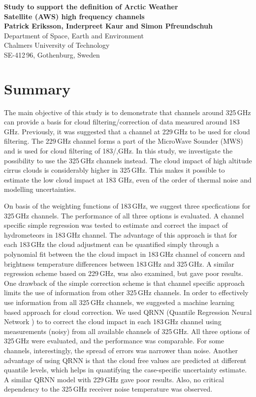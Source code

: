\documentclass[12pt]{article}
\begin{document}
\thispagestyle{empty}
\noindent
\textbf{\Large Study to support the definition of Arctic Weather \vspace{1mm}\\
Satellite (AWS) high frequency channels} \vspace{8mm}\\
{\bf Patrick Eriksson, Inderpreet Kaur and Simon Pfreundschuh}\\
Department of Space, Earth and Environment\\
Chalmers University of Technology\\
SE-412\,96, Gothenburg, Sweden\vspace{10mm}

\section*{Summary}
%
The main objective of this study is to demonstrate that channels around 325\,GHz can provide a basis for cloud filtering/correction of data measured around 183\,GHz. Previously, it was suggested that a channel at 229\,GHz to be used for cloud filtering. The 229\,GHz channel forms a part of the MicroWave Sounder (MWS) and  is used for cloud filtering of 183/,GHz. In this study, we investigate the possibility to use the 325\,GHz channels instead. The cloud impact of high altitude cirrus clouds is considerably higher in 325\,GHz. This makes it possible to estimate the low cloud impact at 183 GHz, even of the order of thermal noise and modelling uncertainties.

On basis of the weighting functions of 183\,GHz, we suggest three specfications for 325\,GHz channels. The performance of all three options is evaluated. A channel specific simple regression was tested to estimate and correct the impact of hydrometeors in 183\,GHz channel. The advantage of this approach is that for each 183\,GHz the cloud adjustment can be quantified simply through a polynomial fit between the the cloud impact in 183\,GHz channel of concern  and brightness temperature differences between 183\,GHz and 325\,GHz. A similar regression scheme based on 229\,GHz, was also examined, but gave poor results. One drawback of the simple correction scheme is that channel specific approach limits the use of information from other 325\,GHz channels. In order to effectively use information from all 325\,GHz channels, we suggested a machine learning based approach for cloud correction. We used QRNN (Quantile Regression Neural Network ) to to correct the cloud impact in each 183\,GHz channel using measurements (noisy) from all available channels of 325\,GHz. All three options of 325\,GHz were evaluated, and the performance was comparable. For some channels, interestingly, the spread of errors was narrower than noise. Another advantage of using QRNN is that the cloud free values are predicted at different quantile levels, which helps in quantifying the case-specific uncertainty estimate. A similar QRNN model with 229\,GHz gave poor results. Also, no critical dependency to the 325\,GHz receiver noise temperature was observed. 
\end{document}
